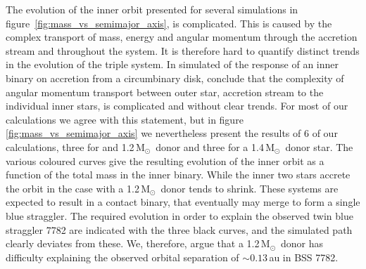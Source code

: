 \documentclass{aastex62}
\newcommand{\MSun}{\mbox{M$_\odot$}}
\begin{document}
The evolution of the inner orbit presented for several simulations in
figure~\ref{fig:mass_vs_semimajor_axis}, is complicated.  This is
caused by the complex transport of mass, energy and angular momentum
through the accretion stream and throughout the system.  It is
therefore hard to quantify distinct trends in the evolution of the
triple system. In simulated of the response of an inner binary on
accretion from a circumbinary disk, \cite{2018arXiv181208175M}
conclude that the complexity of angular momentum transport between
outer star, accretion stream to the individual inner stars, is
complicated and without clear trends. For most of our calculations we
agree with this statement, but in
figure~\,\ref{fig:mass_vs_semimajor_axis} we nevertheless present the
results of 6 of our calculations, three for and 1.2\,\MSun\, donor and
three for a 1.4\,\MSun\, donor star. The various coloured curves give
the resulting evolution of the inner orbit as a function of the total
mass in the inner binary. While the inner two stars accrete the orbit
in the case with a 1.2\,\MSun\, donor tends to shrink. These systems
are expected to result in a contact binary, that eventually may merge
to form a single blue straggler. The required evolution in order to
explain the observed twin blue straggler 7782 are indicated with the
three black curves, and the simulated path clearly deviates from
these. We, therefore, argue that a 1.2\,\MSun\, donor has difficulty
explaining the observed orbital separation of $\sim 0.13$\,au in BSS
7782.
\end{document}
